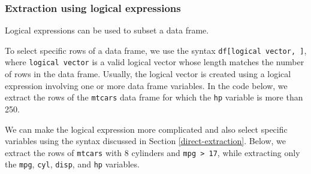 \documentclass[
]{book}
\newenvironment{Shaded}{\begin{snugshade}}{\end{snugshade}}
\newcommand{\CommentTok}[1]{\textcolor[rgb]{0.56,0.35,0.01}{\textit{#1}}}
\newcommand{\DecValTok}[1]{\textcolor[rgb]{0.00,0.00,0.81}{#1}}
\newcommand{\DocumentationTok}[1]{\textcolor[rgb]{0.56,0.35,0.01}{\textbf{\textit{#1}}}}
\newcommand{\FunctionTok}[1]{\textcolor[rgb]{0.00,0.00,0.00}{#1}}
\newcommand{\NormalTok}[1]{#1}
\newcommand{\SpecialCharTok}[1]{\textcolor[rgb]{0.00,0.00,0.00}{#1}}
\newcommand{\StringTok}[1]{\textcolor[rgb]{0.31,0.60,0.02}{#1}}
\theoremstyle{definition}
\theoremstyle{definition}
\theoremstyle{definition}
\theoremstyle{definition}
\theoremstyle{remark}
\begin{document}
\hypertarget{extraction-using-logical-expressions}{%
\subsubsection{Extraction using logical expressions}\label{extraction-using-logical-expressions}}

Logical expressions can be used to subset a data frame.

To select specific rows of a data frame, we use the syntax \texttt{df{[}logical\ vector,\ {]}}, where \texttt{logical\ vector} is a valid logical vector whose length matches the number of rows in the data frame. Usually, the logical vector is created using a logical expression involving one or more data frame variables. In the code below, we extract the rows of the \texttt{mtcars} data frame for which the \texttt{hp} variable is more than 250.

\begin{Shaded}
\end{Shaded}

We can make the logical expression more complicated and also select specific variables using the syntax discussed in Section \ref{direct-extraction}. Below, we extract the rows of \texttt{mtcars} with 8 cylinders and \texttt{mpg\ \textgreater{}\ 17}, while extracting only the \texttt{mpg}, \texttt{cyl}, \texttt{disp}, and \texttt{hp} variables.

\begin{Shaded}
\end{Shaded}
\end{document}
